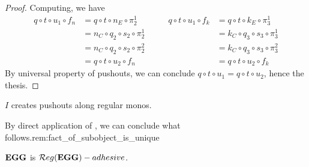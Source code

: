 \begin{proof}
	Computing, we have
	\[
		\begin{split}
			q \circ t \circ u_1 \circ f_n &= q \circ t \circ n_E \circ \pi_2^1 \\ &= n_C \circ q_2 \circ s_2 \circ \pi_2^1 \\&= n_C \circ q_2 \circ s_2 \circ \pi_2^2 \\&=q \circ t \circ u_2 \circ f_n 
			\end{split}
			\qquad
			\begin{split} q \circ t \circ u_1 \circ f_k &= q \circ t \circ k_E \circ \pi_3^1 \\ &= k_C \circ q_3 \circ s_3 \circ \pi_3^1 \\&= k_C \circ q_3 \circ s_3 \circ \pi_3^2 \\&=q \circ t \circ u_2 \circ f_k
			\end{split}
	\]
	By universal property of pushouts, we can conclude $q \circ t \circ u_1 = q \circ t \circ u_2$, hence the thesis.
\end{proof}


\begin{cor}
	$I$ creates pushouts along regular monos.
\end{cor}

By direct application of , we can conclude what follows.{rem:fact_of_subobject_is_unique}

\begin{cor}
	$\mathbf{EGG}$ is $\mathcal{R}eg(\mathbf{EGG})-adhesive$.
\end{cor}





